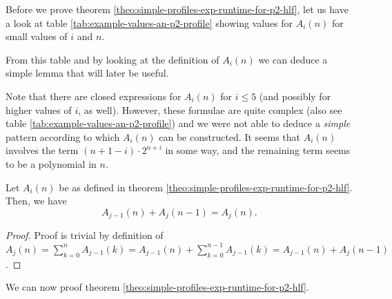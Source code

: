 Before we prove theorem \ref{theo:simple-profiles-exp-runtime-for-p2-hlf}, let us have a look at table \ref{tab:example-values-an-p2-profile} showing values for $A_i(n)$ for small values of $i$ and $n$.

From this table and by looking at the definition of $A_i(n)$ we can deduce a simple lemma that will later be useful.

Note that there are closed expressions for $A_i(n)$ for $i\leq 5$ (and possibly for higher values of $i$, as well). However, these formulae are quite complex (also see table \ref{tab:example-values-an-p2-profile}) and we were not able to deduce a \emph{simple} pattern according to which $A_i(n)$ can be constructed. It seems that $A_i(n)$ involves the term $(n+1-i)\cdot 2^{n+i}$ in some way, and the remaining term seems to be a polynomial in $n$.

\begin{lemma}
  \label{lemma:p2-hlf-profiles-an-simple-recurrence}
  Let $A_i(n)$ be as defined in theorem \ref{theo:simple-profiles-exp-runtime-for-p2-hlf}. Then, we have
  \begin{equation*}
    A_{j-1}(n) + A_{j}(n-1) = A_{j}(n).
  \end{equation*}
\end{lemma}

\begin{proof}
  Proof is trivial by definition of $A_{j}(n) = \sum_{k=0}^{n} A_{j-1}(k) = A_{j-1}(n) + \sum_{k=0}^{n-1} A_{j-1}(k) = A_{j-1}(n) + A_{j}(n-1)$.
\end{proof}

We can now proof theorem \ref{theo:simple-profiles-exp-runtime-for-p2-hlf}.

